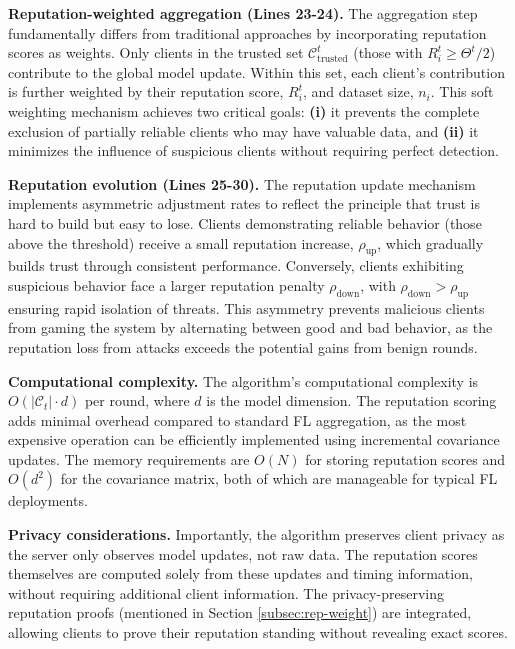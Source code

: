 \documentclass[lettersize,journal]{IEEEtran}
\begin{document}
{\textbf{Reputation-weighted aggregation (Lines 23-24).} The aggregation step fundamentally differs from traditional approaches by incorporating reputation scores as weights. Only clients in the trusted set $\mathcal{C}_{\text{trusted}}^t$ (those with $R_i^t \geq \Theta^t/2$) contribute to the global model update. Within this set, each client's contribution is further weighted by their reputation score, $R_i^t$, and dataset size, $n_i$. This soft weighting mechanism achieves two critical goals: \textbf{(i)} it prevents the complete exclusion of partially reliable clients who may have valuable data, and \textbf{(ii)} it minimizes the influence of suspicious clients without requiring perfect detection.

\textbf{Reputation evolution (Lines 25-30).} The reputation update mechanism implements asymmetric adjustment rates to reflect the principle that trust is hard to build but easy to lose. Clients demonstrating reliable behavior (those above the threshold) receive a small reputation increase, $\rho_{\text{up}}$, which gradually builds trust through consistent performance. Conversely, clients exhibiting suspicious behavior face a larger reputation penalty $\rho_{\text{down}}$, with $\rho_{\text{down}} > \rho_{\text{up}}$ ensuring rapid isolation of threats. This asymmetry prevents malicious clients from gaming the system by alternating between good and bad behavior, as the reputation loss from attacks exceeds the potential gains from benign rounds.

\textbf{Computational complexity.} The algorithm's computational complexity is $O(|\mathcal{C}_t| \cdot d)$ per round, where $d$ is the model dimension. The reputation scoring adds minimal overhead compared to standard FL aggregation, as the most expensive operation can be efficiently implemented using incremental covariance updates. The memory requirements are $O(N)$ for storing reputation scores and $O(d^2)$ for the covariance matrix, both of which are manageable for typical FL deployments.

\textbf{Privacy considerations.} Importantly, the algorithm preserves client privacy as the server only observes model updates, not raw data. The reputation scores themselves are computed solely from these updates and timing information, without requiring additional client information. The privacy-preserving reputation proofs (mentioned in Section \ref{subsec:rep-weight}) are integrated, allowing clients to prove their reputation standing without revealing exact scores.

}
\end{document}
